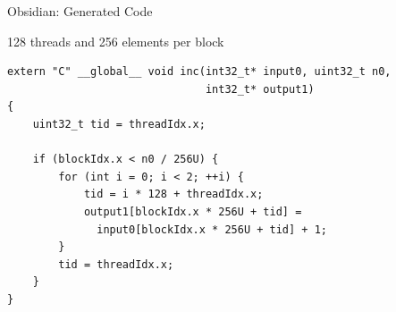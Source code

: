 \documentclass[xcolor=dvipsnames]{beamer}
\begin{document}
%
\begin{frame}[fragile]{Obsidian: Generated Code}
\begin{block}{128 threads and 256 elements per block}
\Fontvi
\begin{verbatim} 
extern "C" __global__ void inc(int32_t* input0, uint32_t n0,
                               int32_t* output1)
{
    uint32_t tid = threadIdx.x;
    
    if (blockIdx.x < n0 / 256U) {
        for (int i = 0; i < 2; ++i) {
            tid = i * 128 + threadIdx.x;
            output1[blockIdx.x * 256U + tid] = 
              input0[blockIdx.x * 256U + tid] + 1;
        }
        tid = threadIdx.x;
    }
}
\end{verbatim} 
\end{block} 


\end{frame} 
\end{document}
